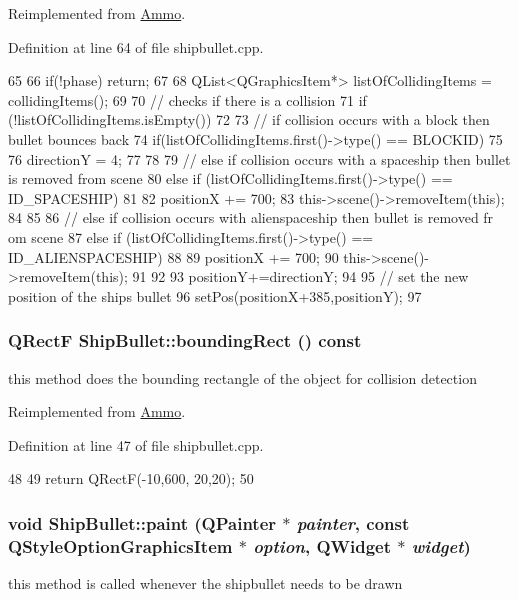 Reimplemented from \hyperlink{class_ammo_a257fb0cdbb4302da65b89447fa6caeaa}{Ammo}.

Definition at line 64 of file shipbullet.cpp.


\begin{DoxyCode}
65 {
66     if(!phase) return;
67 
68     QList<QGraphicsItem*> listOfCollidingItems = collidingItems();
69 
70     // checks if there is a collision
71     if (!listOfCollidingItems.isEmpty())
72     {
73         // if collision occurs with a block then bullet bounces back
74         if(listOfCollidingItems.first()->type() == BLOCKID)
75         {
76             directionY = 4;
77         }
78 
79         // else if collision occurs with a spaceship then bullet is removed from 
      scene
80         else if (listOfCollidingItems.first()->type() == ID_SPACESHIP)
81         {
82             positionX += 700;
83             this->scene()->removeItem(this);
84         }
85 
86         // else if collision occurs with alienspaceship then bullet is removed fr
      om scene
87         else if (listOfCollidingItems.first()->type() == ID_ALIENSPACESHIP)
88         {
89             positionX += 700;
90             this->scene()->removeItem(this);
91         }
92     }
93     positionY+=directionY;
94 
95     // set the new position of the ships bullet
96     setPos(positionX+385,positionY);
97 }
\end{DoxyCode}
\hypertarget{class_ship_bullet_ab2a2a467deb5546778e5f052705959dd}{
\subsubsection[{boundingRect}]{\setlength{\rightskip}{0pt plus 5cm}QRectF ShipBullet::boundingRect () const}}
\label{class_ship_bullet_ab2a2a467deb5546778e5f052705959dd}
this method does the bounding rectangle of the object for collision detection 

Reimplemented from \hyperlink{class_ammo_a4c5548e35a4599210f0599328ef03f01}{Ammo}.

Definition at line 47 of file shipbullet.cpp.


\begin{DoxyCode}
48 {
49   return QRectF(-10,600, 20,20);
50 }
\end{DoxyCode}
\hypertarget{class_ship_bullet_a44c9cf7ab35d5fe69402226b341e2593}{
\subsubsection[{paint}]{\setlength{\rightskip}{0pt plus 5cm}void ShipBullet::paint (QPainter $\ast$ {\em painter}, \/  const QStyleOptionGraphicsItem $\ast$ {\em option}, \/  QWidget $\ast$ {\em widget})}}
\label{class_ship_bullet_a44c9cf7ab35d5fe69402226b341e2593}
this method is called whenever the shipbullet needs to be drawn 

